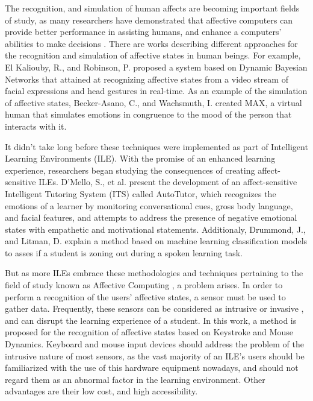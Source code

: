 \documentclass[runningheads,a4paper]{llncs}
\begin{document}
The recognition, and simulation of human affects are becoming important fields of study, as many researchers have demonstrated that affective computers can provide better performance in assisting humans, and enhance a computers' abilities to make decisions \cite{affective-computing}. There are works describing different approaches for the recognition and simulation of affective states in human beings. For example, El Kaliouby, R., and Robinson, P. \cite{facial-expressions} proposed a system based on Dynamic Bayesian Networks that attained at recognizing affective states from a video stream of facial expressions and head gestures in real-time. As an example of the simulation of affective states, Becker-Asano, C., and Wachsmuth, I. \cite{affective-simulation} created MAX, a virtual human that simulates emotions in congruence to the mood of the person that interacts with it.

It didn't take long before these techniques were implemented as part of Intelligent Learning Environments (ILE). With the promise of an enhanced learning experience, researchers began studying the consequences of creating affect-sensitive ILEs. D'Mello, S., et al. \cite{autotutor} present the development of an affect-sensitive Intelligent Tutoring System (ITS) called AutoTutor, which recognizes the emotions of a learner by monitoring conversational cues, gross body language, and facial features, and attempts to address the presence of negative emotional states with empathetic and motivational statements. Additionaly, Drummond, J., and Litman, D. \cite{zoning-out} explain a method based on machine learning classification models to asses if a student is zoning out during a spoken learning task.

But as more ILEs embrace these methodologies and techniques pertaining to the field of study known as Affective Computing \cite{affective-computing}, a problem arises. In order to perform a recognition of the users' affective states, a sensor must be used to gather data. Frequently, these sensors can be considered as intrusive or invasive \cite{intrusive1} \cite{intrusive2} \cite{intrusive3}, and can disrupt the learning experience of a student. In this work, a method is proposed for the recognition of affective states based on Keystroke and Mouse Dynamics. Keyboard and mouse input devices should address the problem of the intrusive nature of most sensors, as the vast majority of an ILE's users should be familiarized with the use of this hardware equipment nowadays, and should not regard them as an abnormal factor in the learning environment. Other advantages are their low cost, and high accessibility.
\end{document}
